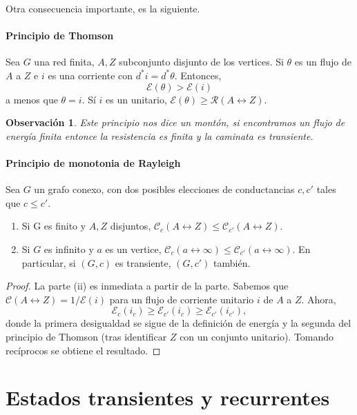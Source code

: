 \documentclass[11pt,a4paper]{article}
\numberwithin{equation}{section}
\theoremstyle{LPplain}
\theoremstyle{LPdef}
\theoremstyle{LPrem}
\newtheorem{obs}[teo]{Observación}
\begin{document}
Otra consecuencia importante, es la siguiente.

\paragraph{Principio de Thomson} Sea $G$ una red finita, $A,Z$ subconjunto disjunto 
  de los vertices. Si $\theta$ es un flujo de $A$ a $Z$ e $i$ es una corriente con 
  $d^{*}i = d^{*}\theta$. Entonces, 
  $$\mathscr{E}(\theta) > \mathscr{E}(i)$$
  a menos que $\theta = i.$ Sí $i$ es un unitario, $\mathscr{E}(\theta) \geq \mathscr{R}(A \leftrightarrow Z).$

\begin{obs}
  Este principio nos dice un montón, si encontramos un flujo de energía finita
  entonce la resistencia es finita y la caminata es transiente.
\end{obs}

\paragraph{Principio de monotonia de Rayleigh} Sea $G$ un grafo conexo, con dos posibles
elecciones de conductancias $c, c'$ tales que $c \leq c'.$
\begin{enumerate}
  \item Si G es finito y $A, Z$ disjuntos, $\mathscr{C}_{c}(A \leftrightarrow Z) \leq
  \mathscr{C}_{c'}(A \leftrightarrow Z).$
  \item Si $G$ es infinito y $a$ es un vertice,
  $\mathscr{C}_{c}(a \leftrightarrow \infty) \leq \mathscr{C}_{c'}(a \leftrightarrow \infty)$.
  En particular, si $(G, c)$ es transiente, $(G, c')$ también.
\end{enumerate}

\begin{proof}
La parte (ii) es inmediata a partir de la parte. Sabemos que 
$\mathscr{C}(A \leftrightarrow Z) = 1/\mathscr{E}(i)$ para un flujo de 
corriente unitario $i$ de $A$ a $Z$. Ahora,
\[
\mathscr{E}_{c}(i_{c}) \ge \mathscr{E}_{c'}(i_{c}) \ge \mathscr{E}_{c'}(i_{c'}),
\]
donde la primera desigualdad se sigue de la definición de energía y la segunda del principio de Thomson (tras identificar $Z$ con un conjunto unitario). Tomando recíprocos se obtiene el resultado.
\end{proof}


\section{Estados transientes y recurrentes} 
\end{document}
